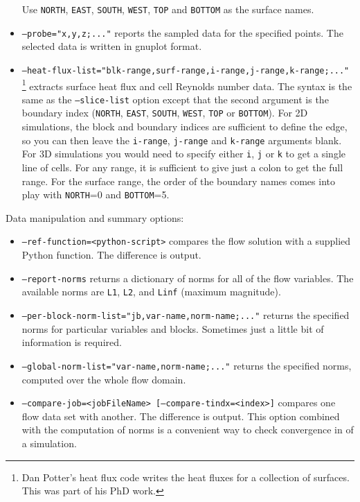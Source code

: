 \begin{itemize}
     Use \texttt{NORTH}, \texttt{EAST}, \texttt{SOUTH}, \texttt{WEST}, \texttt{TOP} and \texttt{BOTTOM} 
     as the surface names.
  \item \texttt{--probe="x,y,z;..."} reports the sampled data for the specified points.
     The selected data is written in gnuplot format.
  \item \texttt{--heat-flux-list="blk-range,surf-range,i-range,j-range,k-range;..."}\,\footnote{Dan Potter's heat flux code writes
     the heat fluxes for a collection of surfaces.  This was part of his PhD work.} extracts surface heat flux and cell Reynolds number data.
     The syntax is the same as the \texttt{--slice-list} option except that the second argument is the boundary index 
     (\texttt{NORTH}, \texttt{EAST}, \texttt{SOUTH}, \texttt{WEST}, \texttt{TOP} or \texttt{BOTTOM}).
     For 2D simulations, the block and boundary indices are sufficient to define the edge, 
     so you can then leave the \texttt{i-range}, \texttt{j-range} and \texttt{k-range} arguments blank.
     For 3D simulations you would need to specify either \texttt{i}, \texttt{j} or \texttt{k} to get a single line of cells.
     For any range, it is sufficient to give just a colon to get the full range.
     For the surface range, the order of the boundary names comes into play with \texttt{NORTH}=0 and \texttt{BOTTOM}=5.
\end{itemize}
Data manipulation and summary options:
\begin{itemize}
  \item \texttt{--ref-function=<python-script>} compares the flow solution with a supplied Python function.
     The difference is output.
  \item \texttt{--report-norms} returns a dictionary of norms for all of the flow variables.
    The available norms are \texttt{L1}, \texttt{L2}, and \texttt{Linf} (maximum magnitude).
  \item \texttt{--per-block-norm-list="jb,var-name,norm-name;..."} returns the specified norms 
     for particular variables and blocks.  Sometimes just a little bit of information is required.
  \item \texttt{--global-norm-list="var-name,norm-name;..."} returns the specified norms,
     computed over the whole flow domain.
  \item \texttt{--compare-job=<jobFileName> [--compare-tindx=<index>]} compares one flow data set with another.
     The difference is output.  This option combined with the computation of norms is a convenient way to check
     convergence in of a simulation.
\end{itemize}
